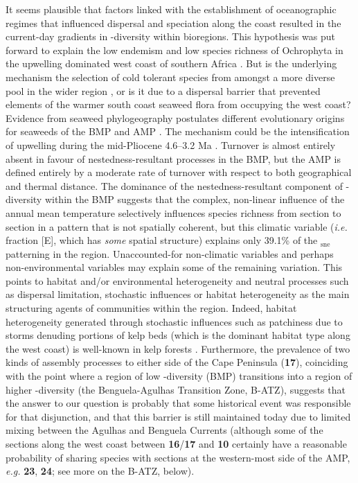 \documentclass[utf8]{frontiersSCNS} %
\begin{document}
It seems plausible that factors linked with the establishment of oceanographic regimes \citep[historical factors \emph{sensu}][]{Baselga2012d} that influenced dispersal and speciation along the coast resulted in the current-day gradients in \textbeta-diversity within bioregions. This hypothesis was put forward to explain the low endemism and low species richness of Ochrophyta in the upwelling dominated west coast of southern Africa \citep{Bolton1986}. But is the underlying mechanism the selection of cold tolerant species from amongst a more diverse pool in the wider region \citep{Bolton1986}, or is it due to a dispersal barrier that prevented elements of the warmer south coast seaweed flora from occupying the west coast? Evidence from seaweed phylogeography postulates different evolutionary origins for seaweeds of the BMP and AMP \citep{Hommersand1986,Hommersand2003}. The mechanism could be the intensification of upwelling during the mid-Pliocene 4.6--3.2 Ma \citep{Marlow2000}. Turnover is almost entirely absent in favour of nestedness-resultant processes in the BMP, but the AMP is defined entirely by a moderate rate of turnover with respect to both geographical and thermal distance. The dominance of the nestedness-resultant component of \textbeta-diversity within the BMP suggests that the complex, non-linear influence of the annual mean temperature selectively influences species richness from section to section in a pattern that is not spatially coherent, but this climatic variable (\emph{i.e.} fraction {[}E{]}, which has \emph{some} spatial structure) explains only 39.1\% of the \textbeta$_{\text{sne}}$ patterning in the region. Unaccounted-for non-climatic variables and perhaps non-environmental variables may explain some of the remaining variation. This points to habitat and/or environmental heterogeneity and neutral processes such as dispersal limitation, stochastic influences or habitat heterogeneity as the main structuring agents of communities within the region. Indeed, habitat heterogeneity generated through stochastic influences such as patchiness due to storms denuding portions of kelp beds (which is the dominant habitat type along the west coast) is well-known in kelp forests \citep{Smale2011}. Furthermore, the prevalence of two kinds of assembly processes to either side of the Cape Peninsula (\textbf{17}), coinciding with the point where a region of low \textalpha-diversity (BMP) transitions into a region of higher \textalpha-diversity (the Benguela-Agulhas Transition Zone, B-ATZ), suggests that the answer to our question is probably that some historical event was responsible for that disjunction, and that this barrier is still maintained today due to limited mixing between the Agulhas and Benguela Currents (although some of the sections along the west coast between \textbf{16}/\textbf{17} and \textbf{10} certainly have a reasonable probability of sharing species with sections at the western-most side of the AMP, \emph{e.g.} \textbf{23}, \textbf{24}; see more on the B-ATZ, below).
\end{document}
